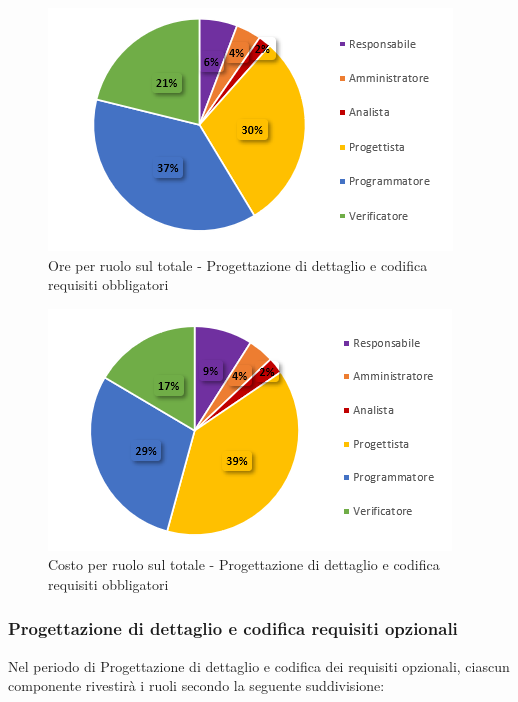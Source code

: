      \begin{figure}[H]
       \centering
        \includegraphics[scale=0.9]{immagini/ore_ruolo_reqObbligatori.png}
        \caption{Ore per ruolo sul totale - Progettazione di dettaglio e codifica requisiti obbligatori}
      \end{figure}
   
     \begin{figure}[H]
       \centering
        \includegraphics[scale=0.9]{immagini/costo_ruolo_reqObbligatori.png}
        \caption{Costo per ruolo sul totale - Progettazione di dettaglio e codifica requisiti obbligatori}
      \end{figure}
   

\subsubsection{Progettazione di dettaglio e codifica requisiti opzionali}
Nel periodo di Progettazione di dettaglio e codifica dei requisiti opzionali, ciascun componente rivestirà i ruoli secondo la seguente suddivisione:
   
